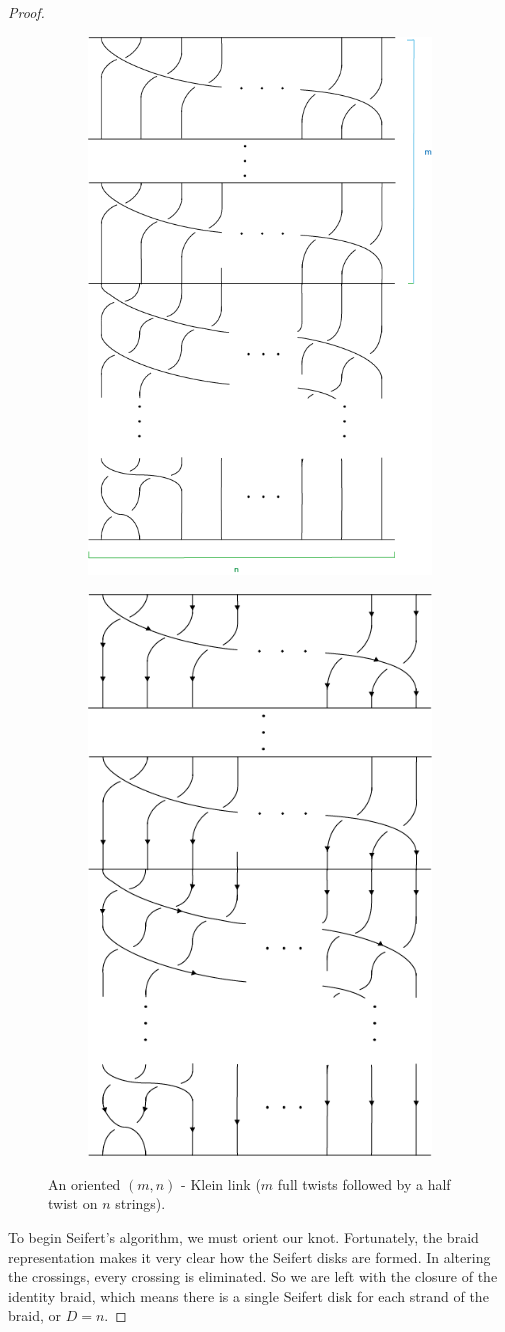 \documentclass[12pt]{article}
\begin{document}
\begin{proof}
\begin{figure}[H]
\centering
\begin{subfigure}{.7\textwidth}
  \centering
  \includegraphics[width=.4\linewidth]{Klein_link}
  \label{fig:sub1}
\end{subfigure}%
\begin{subfigure}{.7\textwidth}
  \includegraphics[width=.4\linewidth]{Klein_link_Oriented}
  \label{fig:sub2}
\end{subfigure}
\caption{\label{Klein link} An oriented $(m, n)$ - Klein link ($m$ full twists followed by a half twist on $n$ strings).}
\label{fig:test}
\end{figure}

To begin Seifert's algorithm, we must orient our knot. Fortunately, the braid representation makes it very clear how the Seifert disks are formed. In altering the crossings, every crossing is eliminated. So we are left with the closure of the identity braid, which means there is a single Seifert disk for each strand of the braid, or $D = n$.


\end{proof}
\end{document}
